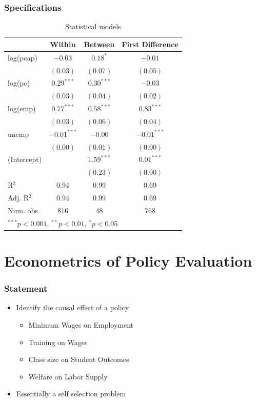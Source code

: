 \documentclass{beamer}
\newcommand{\1}{\mathbb{1}}
\begin{document}
\begin{frame}\frametitle{Specifications}
\begin{table}
\begin{center}
\begin{tabular}{l c c c }
\hline
 & Within & Between & First Difference \\
\hline
log(pcap)   & $-0.03$       & $0.18^{*}$   & $-0.01$       \\
            & $(0.03)$      & $(0.07)$     & $(0.05)$      \\
log(pc)     & $0.29^{***}$  & $0.30^{***}$ & $-0.03$       \\
            & $(0.03)$      & $(0.04)$     & $(0.02)$      \\
log(emp)    & $0.77^{***}$  & $0.58^{***}$ & $0.83^{***}$  \\
            & $(0.03)$      & $(0.06)$     & $(0.04)$      \\
unemp       & $-0.01^{***}$ & $-0.00$      & $-0.01^{***}$ \\
            & $(0.00)$      & $(0.01)$     & $(0.00)$      \\
(Intercept) &               & $1.59^{***}$ & $0.01^{***}$  \\
            &               & $(0.23)$     & $(0.00)$      \\
\hline
R$^2$       & 0.94          & 0.99         & 0.69          \\
Adj. R$^2$  & 0.94          & 0.99         & 0.69          \\
Num. obs.   & 816           & 48           & 768           \\
\hline
\multicolumn{4}{l}{\scriptsize{$^{***}p<0.001$, $^{**}p<0.01$, $^*p<0.05$}}
\end{tabular}
\caption{Statistical models}
\label{table:coefficients}
\end{center}
\end{table}
\end{frame}

\section{Econometrics of Policy Evaluation}

\begin{frame}
\tableofcontents[currentsection] 
\end{frame}

\begin{frame}\frametitle{Statement}
\begin{itemize}
\item Identify the causal effect of a policy
\begin{itemize}
 \item Minimum Wages on Employment
 \item Training on Wages
 \item Class size on Student Outcomes
 \item Welfare on Labor Supply
\end{itemize}
\item Essentially a self selection problem 
\end{itemize}

\end{frame}
\end{document}

